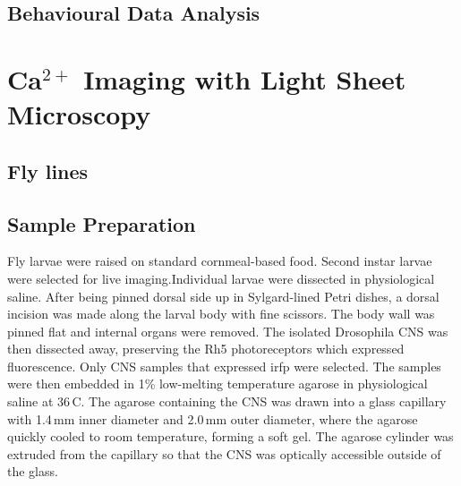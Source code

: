 \subsection{Behavioural Data Analysis}




















\section{Ca$^{2+}$ Imaging with Light Sheet Microscopy}
    \subsection{Fly lines} %
    \subsection{Sample Preparation}
    Fly larvae were raised on standard cornmeal-based food.
    Second instar larvae were selected for live imaging.Individual larvae were dissected in physiological saline.
    After being pinned dorsal side up in Sylgard-lined Petri dishes, a dorsal incision was made along the larval body with fine scissors. The body wall was pinned flat and internal organs were removed. The isolated Drosophila CNS was then dissected away, preserving the Rh5 photoreceptors which expressed fluorescence.  Only CNS samples that expressed irfp were selected.%
    The samples were then embedded in 1\% low-melting temperature agarose in physiological saline at 36\,\textdegree C. The agarose containing the CNS was drawn into a glass capillary with 1.4\,mm inner diameter and 2.0\,mm outer diameter, where the agarose quickly cooled to room temperature, forming a soft gel. The agarose cylinder was extruded from the capillary so that the CNS was optically accessible outside of the glass. %

